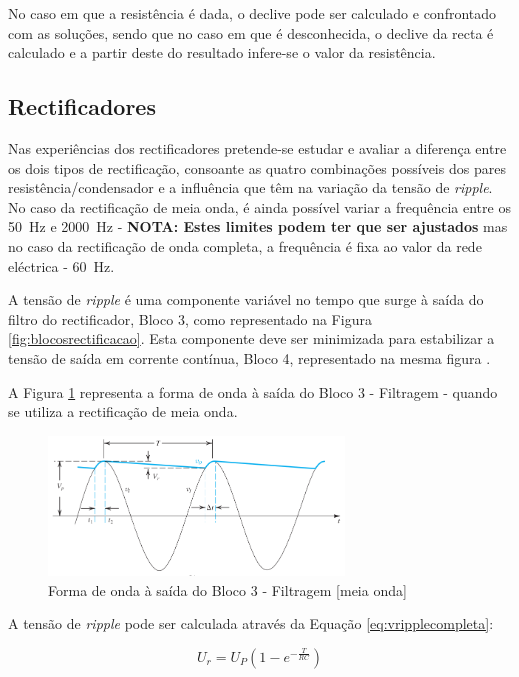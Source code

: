No caso em que a resistência é dada, o declive pode ser calculado e confrontado com as soluções, sendo que no caso em que é desconhecida, o declive da recta é calculado e a partir deste do resultado infere-se o valor da resistência. 

\subsection{Rectificadores}
Nas experiências dos rectificadores pretende-se estudar e avaliar a diferença entre os dois tipos de rectificação, consoante as quatro combinações possíveis dos pares resistência/condensador e a influência que têm na variação da tensão de \textit{ripple}. No caso da rectificação de meia onda, é ainda possível variar a frequência entre os \SI{50}{\hertz} e \SI{2000}{\hertz} - \textbf{NOTA: Estes limites podem ter que ser ajustados} mas no caso da rectificação de onda completa, a frequência é fixa ao valor da rede eléctrica - \SI{60}{\hertz}.

A tensão de \textit{ripple} é uma componente variável no tempo que surge à saída do filtro do rectificador, Bloco 3, como representado na Figura \ref{fig:blocosrectificacao}. Esta componente deve ser minimizada para estabilizar a tensão de saída em corrente contínua, Bloco 4, representado na mesma figura \cite{sedrasmith}.

A Figura \ref{fig:sedraripple} representa a forma de onda à saída do Bloco 3 - Filtragem - quando se utiliza a rectificação de meia onda.
\begin{figure}[hbtp]
	\centering
	\includegraphics[width=0.7\textwidth]{figures/sedra_ripple.png}
	\caption{Forma de onda à saída do Bloco 3 - Filtragem [meia onda] \cite{sedrasmith}}
	\label{fig:sedraripple}
\end{figure}

A tensão de \textit{ripple} pode ser calculada através da Equação \ref{eq:vripplecompleta}:

\begin{equation} \label{eq:vripplecompleta}
	U_{r} = U_{P}(1-e^{-\frac{T}{RC}})
\end{equation}

